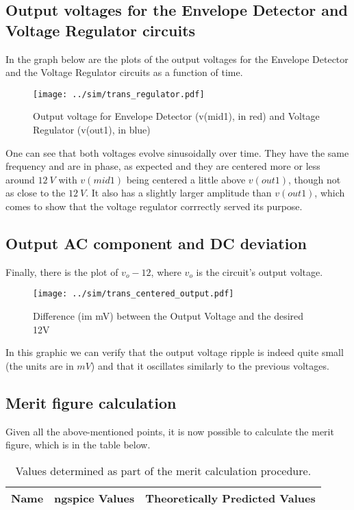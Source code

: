 \subsection{Output voltages for the Envelope Detector and Voltage Regulator circuits}
In the graph below are the plots of the output voltages for the Envelope Detector and the Voltage Regulator circuits as a function of time.

\begin{figure}[H] \centering
\texttt{[image: ../sim/trans\_regulator.pdf]}
\caption{Output voltage for Envelope Detector (v(mid1), in red) and Voltage Regulator (v(out1), in blue)}
\label{fig:phase_sim}
\end{figure}

One can see that both voltages evolve sinusoidally over time. They have the same frequency and are in phase, as expected and they are centered more or less around $12 \ V$ with $v(mid1)$ being centered a little above $v(out1)$, though not as close to the $12 \ V$. It also has a slightly larger amplitude than $v(out1)$, which comes to show that the voltage regulator corrrectly served its purpose.




\subsection{Output AC component and DC deviation}
Finally, there is the plot of $v_o - 12$, where $v_o$ is the circuit's output voltage.

\begin{figure}[H] \centering
\texttt{[image: ../sim/trans\_centered\_output.pdf]}
\caption{Difference (im mV) between the Output Voltage and the desired 12V}
\label{fig:phase_sim}
\end{figure}

In this graphic we can verify that the output voltage ripple is indeed quite small (the units are in $mV$) and that it oscillates similarly to the previous voltages.




\subsection{Merit figure calculation}
Given all the above-mentioned points, it is now possible to calculate the merit figure, which is in the table below.

\begin{table}[H]
  \centering
  \begin{tabular}{|c|c|c|}
    \hline    
    {\bf Name} & {\bf ngspice Values} & {\bf Theoretically Predicted Values} \\ \hline
    
  \end{tabular}
  \caption{Values determined as part of the merit calculation procedure.}
  \label{tab:merit}
\end{table}

